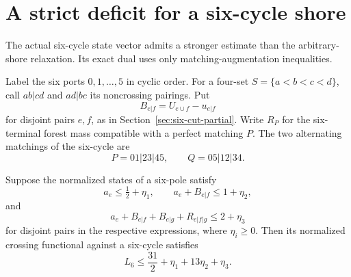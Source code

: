\section{A strict deficit for a six-cycle shore}
\label{sec:six-cycle-shore}

The actual six-cycle state vector admits a stronger estimate than the arbitrary-shore relaxation.
Its exact dual uses only matching-augmentation inequalities.

Label the six ports $0,1,\ldots,5$ in cyclic order.
For a four-set $S=\{a<b<c<d\}$, call $ab|cd$ and $ad|bc$ its noncrossing pairings.
Put
\[
 B_{e|f}=U_{e\cup f}-u_{e|f}
\]
for disjoint pairs $e,f$, as in Section~\ref{sec:six-cut-partial}.
Write $R_P$ for the six-terminal forest mass compatible with a perfect matching $P$.
The two alternating matchings of the six-cycle are
\[
 P=01|23|45,\qquad Q=05|12|34.
\]

\begin{lemma}
\label{lem:six-cycle-functional}
Suppose the normalized states of a six-pole satisfy
\[
 a_e\le\tfrac12+\eta_1,\qquad
 a_e+B_{e|f}\le1+\eta_2,
\]
and
\[
 a_e+B_{e|f}+B_{e|g}+R_{e|f|g}\le2+\eta_3
\]
for disjoint pairs in the respective expressions, where $\eta_i\ge0$.
Then its normalized crossing functional against a six-cycle satisfies
\[
 L_6\le\frac{31}{2}+\eta_1+13\eta_2+\eta_3.
\]
\end{lemma}


